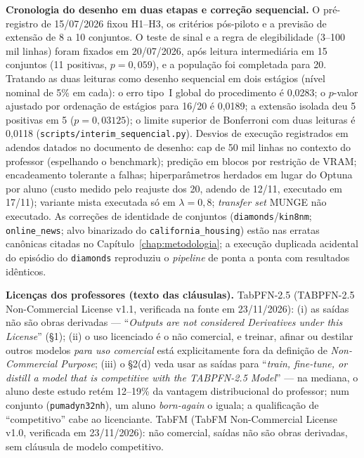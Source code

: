 \textbf{Cronologia do desenho em duas etapas e correção sequencial.}
O pré-registro de 15/07/2026 fixou H1--H3, os critérios pós-piloto e a
previsão de extensão de 8 a 10 conjuntos. O teste de sinal e a regra
de elegibilidade (3--100 mil linhas) foram fixados em 20/07/2026, após
leitura intermediária em 15 conjuntos (11 positivas, $p=0{,}059$), e a
população foi completada para 20. Tratando as duas leituras como
desenho sequencial em dois estágios (nível nominal de 5\% em cada): o
erro tipo~I global do procedimento é 0,0283; o $p$-valor ajustado por
ordenação de estágios para 16/20 é 0,0189; a extensão isolada deu 5
positivas em 5 ($p=0{,}03125$); o limite superior de Bonferroni com
duas leituras é 0,0118
(\texttt{scripts/\allowbreak interim\_\allowbreak sequencial.py}).
Desvios de execução registrados em adendos datados no documento de
desenho: cap de 50 mil linhas no contexto do professor (espelhando o
benchmark); predição em blocos por restrição de VRAM; encadeamento
tolerante a falhas; hiperparâmetros herdados em lugar do Optuna por
aluno (custo medido pelo reajuste dos 20, adendo de 12/11, executado
em 17/11); variante mista executada só em $\lambda{=}0{,}8$;
\emph{transfer set} MUNGE não executado. As correções de identidade de
conjuntos (\texttt{diamonds}/\texttt{kin8nm};
\texttt{online\_news}; alvo binarizado do
\texttt{california\_housing}) estão nas erratas canônicas citadas no
Capítulo~\ref{chap:metodologia}; a execução duplicada acidental do
episódio do \texttt{diamonds} reproduziu o \emph{pipeline} de ponta a
ponta com resultados idênticos.

\textbf{Licenças dos professores (texto das cláusulas).} TabPFN-2.5
(TABPFN-2.5 Non-Commercial License v1.1, verificada na fonte em
23/11/2026): (i) as saídas não são obras derivadas --- ``\emph{Outputs are not
considered Derivatives under this License}'' (\S1); (ii) o uso
licenciado é o não comercial, e treinar, afinar ou destilar outros
modelos \emph{para uso comercial} está explicitamente fora da
definição de \emph{Non-Commercial Purpose}; (iii) o \S2(d) veda usar
as saídas para ``\emph{train, fine-tune, or distill a model that is
competitive with the TABPFN-2.5 Model}'' --- na mediana, o aluno
deste estudo retém 12--19\% da vantagem distribucional do professor;
num conjunto (\texttt{pumadyn32nh}), um aluno \emph{born-again} o
iguala; a qualificação de ``competitivo'' cabe ao
licenciante. TabFM (TabFM Non-Commercial License v1.0, verificada em
23/11/2026): não comercial, saídas não são obras derivadas, sem cláusula de
modelo competitivo.

